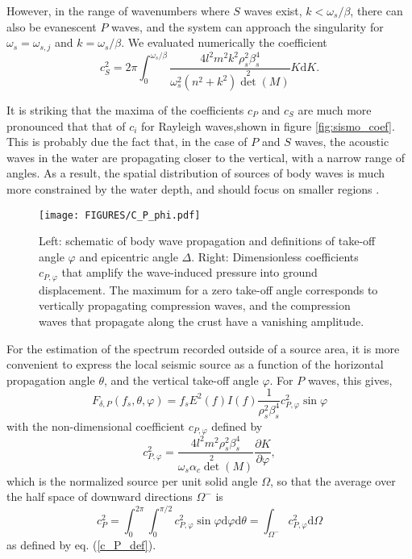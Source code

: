  However, in the range of wavenumbers 
where $S$ waves exist, $k < \omega_s/\beta$, there can also be evanescent $P$ waves, and the system can approach the 
singularity for $\omega_s=\omega_{s,j}$ and $k=\omega_s/\beta$. We evaluated numerically the coefficient 
\begin{equation}
 c_S^2=2 \pi \int_0^{\omega_s/\beta} 
\frac{4 l^2 m^2 k^2 \rho_s^2 \beta_s^4}{\omega_s^2 (n^2+k^2)\det^2 (M)} K {\mathrm d} K.
\end{equation}

It is striking that the maxima of the coefficients $c_P$ and $c_S$ are much more pronounced that that of $c_i$ for Rayleigh waves,shown in figure \ref{fig:sismo_coef}. This is probably due 
the fact that, in  the case of $P$ and $S$ waves, the acoustic waves in the water are propagating closer to the vertical, with a narrow range of angles.  As a result, the spatial distribution 
of sources of body waves is much more constrained by the water depth, and should focus on smaller regions \citep{Obrebski&al.2013}. 
\begin{figure}
\centerline{\texttt{[image: FIGURES/C\_P\_phi.pdf]}}
  \caption{Left: schematic of body wave propagation and definitions of take-off angle $\varphi$ and epicentric angle $\Delta$. Right: Dimensionless coefficients  $c_{P,\varphi}$ that amplify the wave-induced pressure into ground displacement. The 
maximum for a zero take-off angle corresponds to vertically propagating compression waves, and the compression waves that propagate 
along the crust have a vanishing amplitude.}
\label{fig:sismo_coef_CPphi}
\end{figure}

For the estimation of the spectrum recorded outside of a source area, it is more convenient to 
express the local seismic source as a function of the horizontal propagation angle $\theta$, and the vertical take-off angle 
$\varphi$. For $P$ waves, this gives, 
\begin{equation}
F_{\delta,P}(f_s,\theta,\varphi)= f_s   E^2(f)I(f)  \frac{1}{\rho_s^2 \beta_s^4 } c_{P,\varphi}^2 \sin \varphi
\label{eq:P_wave_at_source}
\end{equation}
with the non-dimensional coefficient $c_{P,\varphi}$ defined by 
\begin{equation}
c_{P,\varphi}^2=
\frac{4 l^2 m^2  \rho_s^2 \beta_s^4}{\omega_s \alpha_c  \det^2 (M)}\frac{\partial K}{\partial \varphi}, 
\end{equation}
which is the normalized source per unit solid angle $\Omega$, so that the average over the half space of downward directions 
${\Omega^-}$ is
\begin{equation}
c_P^2 = \int_0^{2 \pi} \int_0^{\pi/2} c_{P,\varphi}^2 \sin \varphi {\mathrm d} \varphi  {\mathrm d}\theta  =  \int_{\Omega^-} c_{P,\varphi}^2  {\mathrm d} \Omega
\end{equation}
as defined by eq. (\ref{c_P_def}). 

